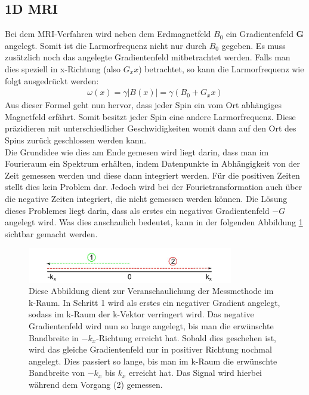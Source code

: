 \subsection{1D MRI}
\label{sec:1DMRIkapitel}
Bei dem MRI-Verfahren wird neben dem Erdmagnetfeld $B_0$ ein Gradientenfeld \textbf{G} angelegt.
Somit ist die Larmorfrequenz nicht nur durch $B_0$ gegeben.
Es muss zusätzlich noch das angelegte Gradientenfeld mitbetrachtet werden.
Falls man dies speziell in x-Richtung (also $G_xx$) betrachtet, so kann die Larmorfrequenz wie folgt ausgedrückt werden:
\begin{align}
    \omega(x)=\gamma |B(x)|= \gamma \left(B_0+G_xx\right) \label{eq:gradientlarmor}
\end{align}
Aus dieser Formel geht nun hervor, dass jeder Spin ein vom Ort abhängiges Magnetfeld erfährt.
Somit besitzt jeder Spin eine andere Larmorfrequenz.
Diese präzidieren mit unterschiedlicher Geschwidigkeiten womit dann auf den Ort des Spins zurück geschlossen werden kann. \\

Die Grundidee wie dies am Ende gemesen wird liegt darin, dass man im Fourieraum ein Spektrum erhälten, indem Datenpunkte in Abhängigkeit von der Zeit gemessen werden und diese dann integriert werden.
Für die positiven Zeiten stellt dies kein Problem dar.
Jedoch wird bei der Fourietransformation auch über die negative Zeiten integriert, die nicht gemessen werden können.
Die Lösung dieses Problemes liegt darin, dass als erstes ein negatives Gradientenfeld $-G$ angelegt wird.
Was dies anschaulich bedeutet, kann in der folgenden Abbildung \ref{fig:1DMRI} sichtbar gemacht werden.  
\begin{figure}[H]
    \centering
    \includegraphics[width=0.8\textwidth]{Abbildungen/1DMRIkraum.JPG}
    \caption[Veranschaulichter Verlauf des k-Vektors im 1D-MRI]{Diese Abbildung dient zur Veranschaulichung der Messmethode im k-Raum.
    In Schritt 1 wird als erstes ein negativer Gradient angelegt, sodass im k-Raum der k-Vektor verringert wird.
    Das negative Gradientenfeld wird nun so lange angelegt, bis man die erwünschte Bandbreite in $-k_{x}$-Richtung erreicht hat.
    Sobald dies geschehen ist, wird das gleiche Gradientenfeld nur in positiver Richtung nochmal angelegt.
    Dies passiert so lange,  bis man im k-Raum die erwünschte Bandbreite von $-k_{x}$ bis $k_{x}$ erreicht hat.
    Das Signal wird hierbei während dem Vorgang (2) gemessen.\cite{Schmidt}}
    \label{fig:1DMRI}
\end{figure}

